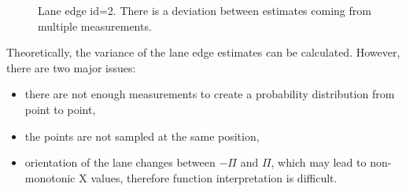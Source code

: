 \documentclass[sn-mathphys-num]{sn-jnl}%
\begin{document}
\begin{figure}[h]
    \caption{Lane edge id=2. There is a deviation between estimates coming from multiple measurements.}
    \label{fig:ZZ_straight_close}
\end{figure}
Theoretically, the variance of the lane edge estimates can be calculated. However, there are two major issues:
\begin{itemize}
    \item there are not enough measurements to create a probability distribution from point to point,
    \item the points are not sampled at the same position,
    \item orientation of the lane changes between $-\Pi$ and $\Pi$, which may lead to non-monotonic X values, therefore function interpretation is difficult.
\end{itemize}
\end{document}

